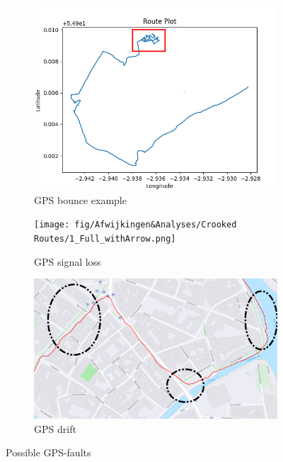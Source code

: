 \documentclass[conference]{IEEEtran}
\begin{document}
\begin{figure}[h]
    \centering
    \begin{subfigure}[b]{.48\linewidth}
        \centering
        \caption{GPS bounce example}
        \includegraphics[width=\linewidth]{fig/Afwijkingen&Analyses/Crooked Routes/Crooked GPS Route_Cart.png}
    \end{subfigure}
    \begin{subfigure}[b]{.38\linewidth}
        \centering
        \caption{GPS signal loss}
        \texttt{[image: fig/Afwijkingen\&Analyses/Crooked Routes/1\_Full\_withArrow.png]}
    \end{subfigure}
    \begin{subfigure}[b]{0.75\linewidth}
        \centering
        \caption{GPS drift}
        \includegraphics[width=\linewidth]{fig/Afwijkingen&Analyses/Crooked Routes/GPS-Drift.png}
    \end{subfigure}
    \caption{Possible GPS-faults}
\end{figure}
\end{document}
